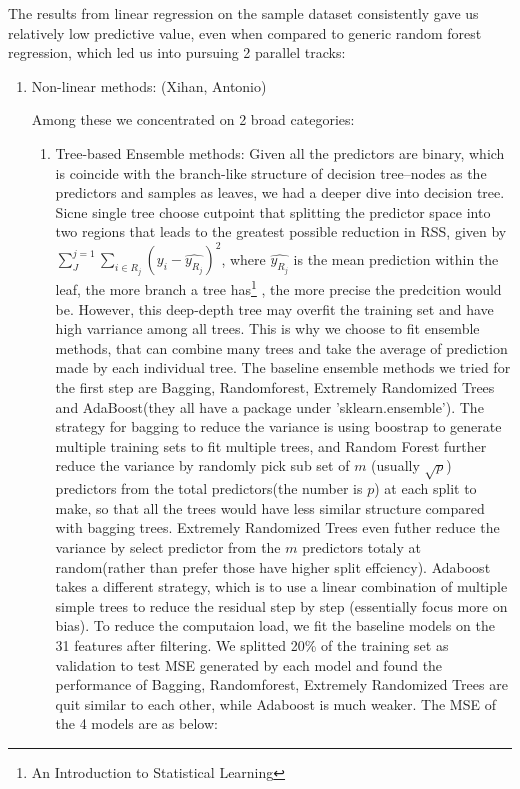 \documentclass[11pt]{article}
\begin{document}
The results from linear regression on the sample dataset consistently gave us relatively low predictive value, even when compared to generic random forest regression, which led us into pursuing 2 parallel tracks:

\begin{enumerate}

\item Non-linear methods: (Xihan, Antonio)

Among these we concentrated on 2 broad categories:

\begin{enumerate}

\item Tree-based Ensemble methods: Given all the predictors are binary, which is coincide with the branch-like structure of decision tree--nodes as the predictors and samples as leaves, we had a deeper dive into decision tree. Sicne single tree choose cutpoint that splitting the predictor space into two regions that leads to the greatest possible reduction in RSS, given by $\sum_{J}^{j=1}\sum_{i\in R_{j}}(y_{i}-\hat{y_{R_{j}}})^{2}$, where $\hat{y_{R_{j}}}$ is the mean prediction within the leaf, the more branch a tree has\footnote{An Introduction to Statistical Learning} , the more precise the predcition would be. However, this deep-depth tree may overfit the training set and have high varriance among all trees. This is why we choose to fit ensemble methods, that can combine many trees and take the average of prediction made by each individual tree. The baseline ensemble methods we tried for the first step are Bagging, Randomforest, Extremely Randomized Trees and AdaBoost(they all have a package under 'sklearn.ensemble'). The strategy for bagging to reduce the variance is using boostrap to generate multiple training sets to fit multiple trees, and Random Forest further reduce the variance by randomly pick sub set of $\mathit{m}$ (usually $\sqrt{p}$) predictors from the total predictors(the number is $\mathit{p}$) at each split to make, so that all the trees would have less similar structure compared with bagging trees. Extremely Randomized Trees even futher reduce the variance by select predictor from the $\mathit{m}$ predictors totaly at random(rather than prefer those have higher split effciency). Adaboost takes a different strategy, which is to use a linear combination of multiple simple trees to reduce the residual step by step (essentially focus more on bias). To reduce the computaion load, we fit the baseline models on the 31 features after filtering. We splitted 20\% of the training set as validation to test MSE generated by each model and found the performance of Bagging, Randomforest, Extremely Randomized Trees are quit similar to each other, while Adaboost is much weaker. The MSE of the 4 models are as below: 


\end{enumerate}
\end{enumerate}
\end{document}
